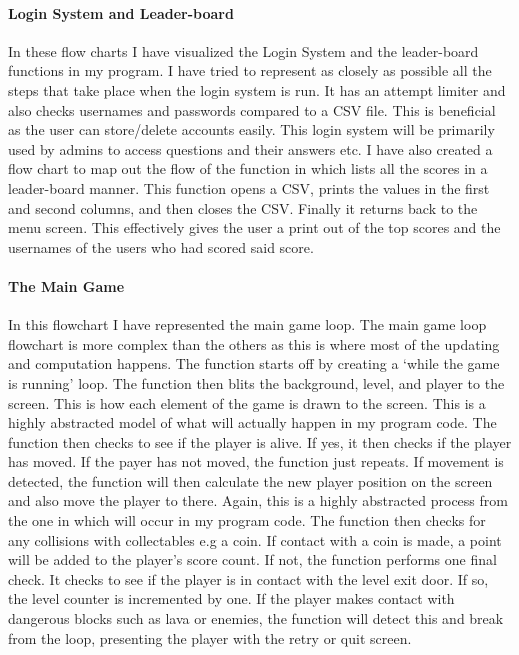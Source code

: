 \documentclass[12pt]{report}
\begin{document}
\paragraph{Login System and Leader-board}
In these flow charts I have visualized the Login System and the leader-board functions in my program. I have tried to represent as closely as possible all the steps that take place when the login system is run. It has an attempt limiter and also checks usernames and passwords compared to a CSV file. This is beneficial as the user can store/delete accounts easily. This login system will be primarily used by admins to access questions and their answers etc. I have also created a flow chart to map out the flow of the function in which lists all the scores in a leader-board manner. This function opens a CSV, prints the values in the first and second columns, and then closes the CSV. Finally it returns back to the menu screen. This effectively gives the user a print out of the top scores and the usernames of the users who had scored said score.

\paragraph{The Main Game}
In this flowchart I have represented the main game loop. The main game loop flowchart is more complex than the others as this is where most of the updating and computation happens. The function starts off by creating a ‘while the game is running’ loop. The function then blits the background, level, and player to the screen. This is how each element of the game is drawn to the screen. This is a highly abstracted model of what will actually happen in my program code. The function then checks to see if the player is alive. If yes, it then checks if the player has moved. If the payer has not moved, the function just repeats. If movement is detected, the function will then calculate the new player position on the screen and also move the player to there. Again, this is a highly abstracted process from the one in which will occur in my program code. The function then checks for any collisions with collectables e.g a coin. If contact with a coin is made, a point will be added to the player's score count. If not, the function performs one final check. It checks to see if the player is in contact with the level exit door. If so, the level counter is incremented by one. If the player makes contact with dangerous blocks such as lava or enemies, the function will detect this and break from the loop, presenting the player with the retry or quit screen.
\end{document}
